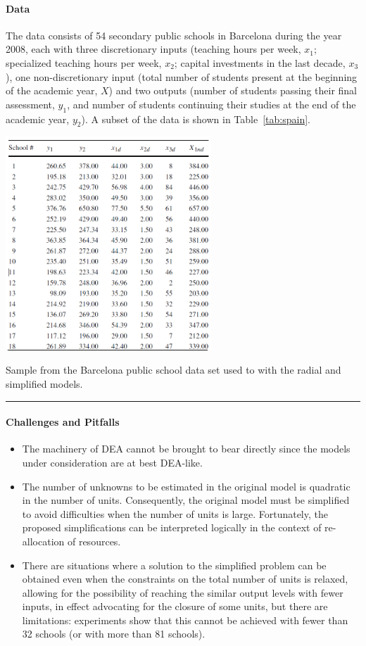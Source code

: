 \paragraph*{Data}
The data consists of 54 secondary public schools in Barcelona during the year 2008, each with three discretionary inputs (teaching hours per week, $x_1$; specialized teaching hours per week, $x_2$; capital investments in the last decade, $x_3$), one non-discretionary input (total number of students present at the beginning of the academic year, $X$) and two outputs (number of students passing their final assessment, $y_1$, and number of students continuing their studies at the end of the academic year, $y_2$). A subset of the data is shown in Table~\ref{tab:spain}.
\begin{table}[t]
  \begin{center}
    \includegraphics[width=0.58\textwidth]{images/OPT/publicschooldata}
  \end{center}
  \caption[\small Sample from the Barcelona public school data.]{\small Sample from the Barcelona public school data set used to with the radial and simplified models.}\hrule
  \label{tab:spain}
\end{table}
\paragraph*{Challenges and Pitfalls}
\begin{itemize}[noitemsep]
\item The machinery of DEA cannot be brought to bear directly since the models under consideration are at best DEA-like.
\item The number of unknowns to be estimated in the original model is quadratic in the number of units. Consequently, the original model must be simplified to avoid difficulties when the number of units is large. Fortunately, the proposed simplifications can be interpreted logically in the context of re-allocation of resources.
\item There are situations where a solution to the simplified problem can be obtained even when the constraints on the total number of units is relaxed, allowing for the possibility of reaching the similar output levels with fewer inputs, in effect advocating for the closure of some units, but there are limitations: experiments show that this cannot be achieved with fewer than 32 schools (or with more than 81 schools).  
\end{itemize}
